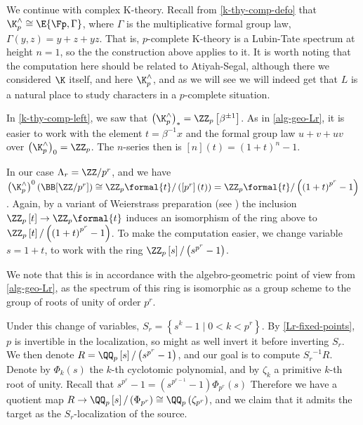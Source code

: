 \begin{example}\label{k-thy-Lr}
	We continue with complex K-theory.
	Recall from \cref{k-thy-comp-defo} that $\K_p^\wedge \cong \E{\Fp, \Gamma}$, where $\Gamma$ is the multiplicative formal group law, $\Gamma\left(y,z\right) = y + z + yz$.
	That is, $p$-complete K-theory is a Lubin-Tate spectrum at height $n = 1$, so the the construction above applies to it.
	It is worth noting that the computation here should be related to Atiyah-Segal, although there we considered $\K$ itself, and here $\K_p^\wedge$, and as we will see we will indeed get that $L$ is a natural place to study characters in a $p$-complete situation.
	
	In \cref{k-thy-comp-left}, we saw that $\left(\K_p^\wedge\right)_* = \ZZ_p\left[\beta^{\pm 1}\right]$.
	As in \cref{alg-geo-Lr}, it is easier to work with the element $t = \beta^{-1} x$ and the formal group law $u + v + uv$ over $\left(\K_p^\wedge\right)_0 = \ZZ_p$.
	The $n$-series then is $\left[n\right]\left(t\right) = \left(1 + t\right)^n - 1$.
	
	In our case $\Lambda_r = \ZZ/p^r$, and we have
	$
	\left(\K_p^\wedge\right)^0\left(\BB[\ZZ/p^r]\right)
	\cong \ZZ_p\formal{t}/\left(\left[p^r\right]\left(t\right)\right)
	= \ZZ_p\formal{t}/\left(\left(1 + t\right)^{p^r} - 1\right)
	$.
	Again, by a variant of Weierstrass preparation (see \cite[5.1]{HKR}) the inclusion $\ZZ_p\left[t\right] \to \ZZ_p\formal{t}$ induces an isomorphism of the ring above to 	$\ZZ_p\left[t\right]/\left(\left(1 + t\right)^{p^r} - 1\right)$.
	To make the computation easier, we change variable $s = 1+t$, to work with the ring
	$\ZZ_p\left[s\right]/\left(s^{p^r} - 1\right)$.
	
	We note that this is in accordance with the algebro-geometric point of view from \cref{alg-geo-Lr}, as the spectrum of this ring is isomorphic as a group scheme to the group of roots of unity of order $p^r$.
	
	Under this change of variables, $S_r = \left\{s^k - 1 \mid 0 < k < p^r\right\}$.
	By \cref{Lr-fixed-points}, $p$ is invertible in the localization, so might as well invert it before inverting $S_r$.
	We then denote $R = \QQ_p\left[s\right]/\left(s^{p^r} - 1\right)$, and our goal is to compute ${S_r}^{-1} R$.
	Denote by $\Phi_k\left(s\right)$ the $k$-th cyclotomic polynomial, and by $\zeta_k$ a primitive $k$-th root of unity.
	Recall that $s^{p^r} - 1 = \left(s^{p^{r-1}} - 1\right) \Phi_{p^r}\left(s\right)$
	Therefore we have a quotient map $R \to \QQ_p\left[s\right]/\left(\Phi_{p^r}\right) \cong \QQ_p\left(\zeta_{p^r}\right)$, and we claim that it admits the target as the $S_r$-localization of the source.
	

\end{example}
